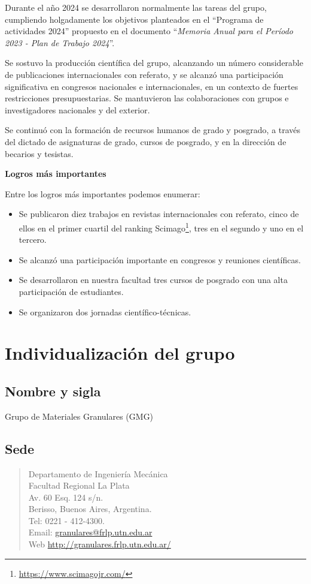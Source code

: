 \documentclass[a4paper,11pt,twoside,final,titlepage,onecolumn,openright]{report}
\begin{document}
Durante el año 2024 se desarrollaron normalmente las tareas del grupo, cumpliendo holgadamente los objetivos planteados en el ``Programa de actividades 2024'' propuesto en el documento ``\textit{Memoria Anual para el Período 2023 - Plan de Trabajo 2024}''. 

Se sostuvo la producción científica del grupo, alcanzando un número considerable de publicaciones internacionales con referato, y se alcanzó una participación significativa en congresos nacionales e internacionales, en un contexto de fuertes restricciones presupuestarias. Se mantuvieron las colaboraciones con grupos e investigadores nacionales y del exterior.

Se continuó con la formación de recursos humanos de grado y posgrado, a través del dictado de asignaturas de grado, cursos de posgrado, y en la dirección de becarios y tesistas.

\vspace{0.5cm}

{\bf Logros más importantes}

Entre los logros más importantes podemos enumerar:

\begin{itemize}
\item Se publicaron diez trabajos en revistas internacionales con referato, cinco de ellos en el primer cuartil del ranking Scimago\footnote{\url{https://www.scimagojr.com/}}, tres en el segundo y uno en el tercero.
\item Se alcanzó una participación importante en congresos y reuniones científicas.
\item Se desarrollaron en nuestra facultad tres cursos de posgrado con una alta participación de estudiantes.
\item Se organizaron dos jornadas científico-técnicas.
\end{itemize}


\section{Individualización del grupo}

\subsection{Nombre y sigla}
 Grupo de Materiales Granulares (GMG)

 \subsection{Sede}
\begin{quote}
Departamento de Ingeniería Mecánica \\
Facultad Regional La Plata\\
Av. 60 Esq. 124 s/n.\\
Berisso, Buenos Aires, Argentina. \\
Tel: 0221 - 412-4300. \\
Email: \href{mailto://granulares@frlp.utn.edu.ar}{granulares@frlp.utn.edu.ar} \\
Web \href{http://granulares.frlp.utn.edu.ar/}{http://granulares.frlp.utn.edu.ar/}
\end{quote}
\end{document}
